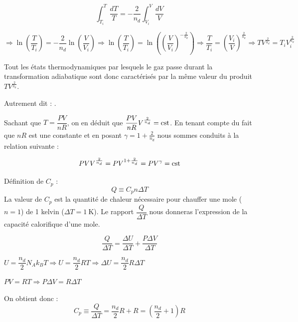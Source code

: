 \documentclass	[11pt, a4paper, openany]{book}
\begin{document}
		$$\int_{T_i}^{T} \frac{dT}{T} = -\frac{2}{n_d} \int_{V_i}^{V} \frac{dV}{V}$$
			
		$\Rightarrow \ln \left(\dfrac{T}{T_i}\right) = -\dfrac{2}{n_d} \ln \left(\dfrac{V}{V_i}\right) \Rightarrow \ln \left(\dfrac{T}{T_i}\right) =  \ln \left(\left(\dfrac{V}{V_i}\right)^{-\frac{2}{n_d}}\right) \Rightarrow \dfrac{T}{T_i} = \left(\dfrac{V_i}{V}\right)^{\frac{2}{n_d}} \Rightarrow TV^{\frac{2}{n_d}} = T_i V_i^{\frac{2}{n_d}}$
			
		Tout les états thermodynamiques par lesquels le gaz passe durant la transformation adiabatique sont donc caractérisés par la même valeur du produit $TV^{\frac{2}{n_d}}$.
			
		Autrement dit : .
			
		Sachant que $T = \dfrac{PV}{nR}$, on en déduit que $\dfrac{PV}{nR}V^{\frac{2}{n_d}} = \text{cst}$. En tenant compte du fait que $nR$ est une constante et en posant $\gamma=1+\frac{2}{n_d}$ nous sommes conduits à la relation suivante :
			
		$$PV V^{\frac{2}{n_d}} = PV^{1+\frac{2}{n_d}}= PV^\gamma=\text{cst} $$
		
		\vspace{0,5cm}
		
			
		Définition de $C_p$ : $$Q \equiv C_p n \Delta T$$ La valeur de $C_p$ est la quantité de chaleur nécessaire pour chauffer une mole ($n=1$) de 1 kelvin ($\Delta T = 1\ \text{K}$). Le rapport $\dfrac{Q}{\Delta T}$ nous donneras l'expression de la capacité calorifique d'une mole.
			
		$$ \frac{Q}{\Delta T} = \frac{\Delta U}{\Delta T} + \frac{P\Delta V}{\Delta T}$$
			
		$U = \dfrac{n_d}{2}N_Ak_BT \Rightarrow U = \dfrac{n_d}{2}RT \Rightarrow \Delta U = \dfrac{n_d}{2}R\Delta T$
			
		$ PV = RT \Rightarrow P \Delta V = R \Delta T$
			
		On obtient donc : $$ C_p \equiv \frac{Q}{\Delta T} = \frac{n_d}{2}R + R = (\frac{n_d}{2}+1) R$$
		
		\vspace{0,5cm}
		
			
\end{document}
